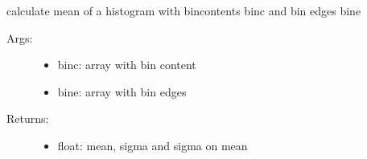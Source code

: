 \documentclass[letterpaper,10pt,english]{sphinxmanual}
\begin{document}
\begin{fulllineitems}
\label{\detokenize{index:PhyPraKit.PhyPraKit.histstat}}
calculate mean of a histogram with bincontents binc and bin edges bine
\begin{description}
\item[{Args:}] \leavevmode\begin{itemize}
\item {} 
binc: array with bin content

\item {} 
bine: array with bin edges

\end{itemize}

\item[{Returns:}] \leavevmode\begin{itemize}
\item {} 
float: mean, sigma and sigma on mean

\end{itemize}

\end{description}

\end{fulllineitems}

\end{document}
